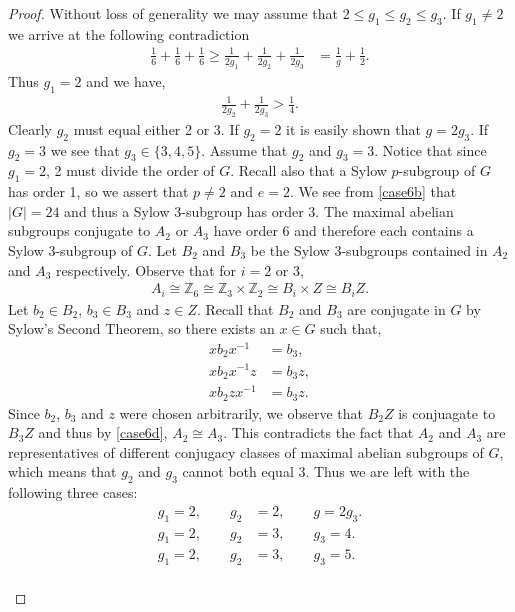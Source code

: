 \documentclass[a4paper , 11pt]{book}
\theoremstyle{definition}
\theoremstyle{remark}
\begin{document}
\begin{proof}
Without loss of generality we may assume that $2 \leq g_1 \leq g_2 \leq g_3$. If $g_1 \neq 2$ we arrive at the following contradiction
\begin{align*} \frac{1}{6} + \frac{1}{6} + \frac{1}{6} \geq \frac{1}{2g_1} + \frac{1}{2g_2} + \frac{1}{2g_3} &= \frac{1}{g} + \frac{1}{2}.
\end{align*}
Thus $g_1 = 2$ and we have,
\begin{align}\label{case6c} \frac{1}{2g_2} + \frac{1}{2g_3} > \frac{1}{4}.
\end{align}
\newpage
Clearly $g_2$ must equal either 2 or 3. If $g_2 = 2$ it is easily shown that $g=2 g_3$. If $g_2 = 3$ we see that $g_3 \in \{ 3,4,5 \}$. Assume that $g_2$ and $g_3 = 3$. Notice that since  $g_1 = 2$, 2 must divide the order of $G$. Recall also that a Sylow $p$-subgroup of $G$ has order 1, so we assert that $p \neq 2$ and $e=2$. We see from \eqref{case6b} that $|G| = 24$ and thus a Sylow $3$-subgroup has order 3. The maximal abelian subgroups conjugate to $A_2$ or $A_3$ have order 6 and therefore each contains a Sylow $3$-subgroup of $G$. Let $B_2$ and $B_3$ be the Sylow $3$-subgroups contained in $A_2$ and $A_3$ respectively. Observe that for $i = 2$ or 3,
\begin{align}\label{case6d} A_i \cong \mathbb{Z}_6 \cong \mathbb{Z}_3 \times \mathbb{Z}_2 \cong B_i \times Z \cong B_i Z. 
\end{align}
Let $b_2 \in B_2$, $b_3 \in B_3$ and $z \in Z$. Recall that $B_2$ and $B_3$ are conjugate in $G$ by Sylow's Second Theorem, so there exists an $x \in G$ such that,
\begin{align*} x b_2 x^{-1} &= b_3,
\\ x b_2 x^{-1} z &= b_3 z,
\\ x b_2 z x^{-1} &= b_3 z.
\end{align*} 
Since $b_2$, $b_3$ and $z$ were chosen arbitrarily, we observe that $B_2 Z$ is conjuagate to $B_3 Z$ and thus by \eqref{case6d}, $A_2 \cong A_3$. This contradicts the fact that $A_2$ and $A_3$ are representatives of different conjugacy classes of maximal abelian subgroups of $G$, which means that $g_2$ and $g_3$ cannot both equal 3. Thus we are left with the following three cases:
\begin{align*} g_1 = 2, \qquad g_2&=2, \qquad g=2 g_3.
\\[1ex] g_1 = 2, \qquad g_2&=3, \qquad g_3 = 4.
\\[1ex] g_1 = 2, \qquad g_2&=3, \qquad g_3 = 5.
\end{align*}
\\

\end{proof}
\end{document}
